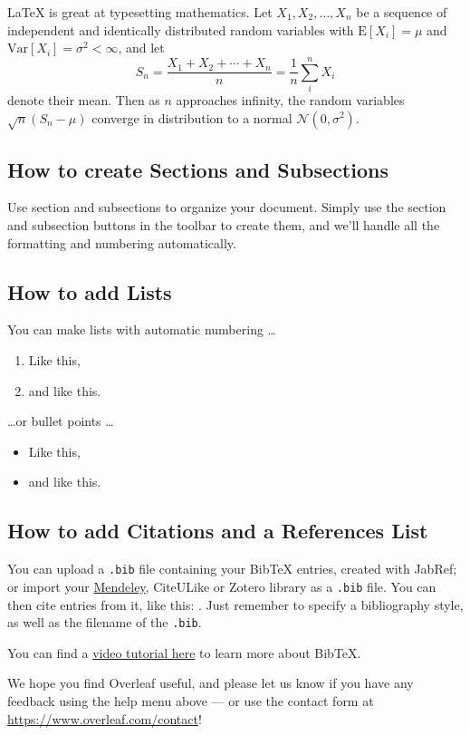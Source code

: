 \documentclass[12pt]{article}
\begin{document}
\LaTeX{} is great at typesetting mathematics. Let $X_1, X_2, \ldots, X_n$ be a sequence of independent and identically distributed random variables with $\text{E}[X_i] = \mu$ and $\text{Var}[X_i] = \sigma^2 < \infty$, and let
\[S_n = \frac{X_1 + X_2 + \cdots + X_n}{n}
      = \frac{1}{n}\sum_{i}^{n} X_i\]
denote their mean. Then as $n$ approaches infinity, the random variables $\sqrt{n}(S_n - \mu)$ converge in distribution to a normal $\mathcal{N}(0, \sigma^2)$.


\subsection{How to create Sections and Subsections}

Use section and subsections to organize your document. Simply use the section and subsection buttons in the toolbar to create them, and we'll handle all the formatting and numbering automatically.

\subsection{How to add Lists}

You can make lists with automatic numbering \dots

\begin{enumerate}
\item Like this,
\item and like this.
\end{enumerate}
\dots or bullet points \dots
\begin{itemize}
\item Like this,
\item and like this.
\end{itemize}

\subsection{How to add Citations and a References List}

You can upload a \verb|.bib| file containing your BibTeX entries, created with JabRef; or import your \href{https://www.overleaf.com/blog/184}{Mendeley}, CiteULike or Zotero library as a \verb|.bib| file. You can then cite entries from it, like this: \cite{greenwade93}. Just remember to specify a bibliography style, as well as the filename of the \verb|.bib|.

You can find a \href{https://www.overleaf.com/help/97-how-to-include-a-bibliography-using-bibtex}{video tutorial here} to learn more about BibTeX.

We hope you find Overleaf useful, and please let us know if you have any feedback using the help menu above --- or use the contact form at \url{https://www.overleaf.com/contact}!



\end{document}
